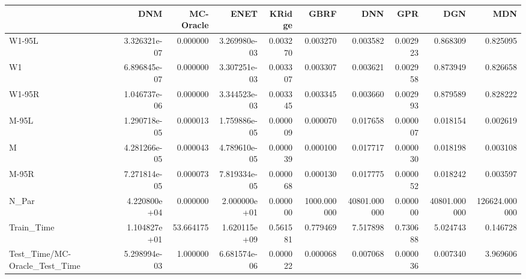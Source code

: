\begin{tabular}{lrrrrrrrrr}
\toprule
{} &           DNM &  MC-Oracle &          ENET &    KRidge &         GBRF &           DNN &       GPR &           DGN &            MDN \\
\midrule
W1-95L                        &  3.326321e-07 &   0.000000 &  3.269980e-03 &  0.003270 &     0.003270 &      0.003582 &  0.002923 &      0.868309 &       0.825095 \\
W1                            &  6.896845e-07 &   0.000000 &  3.307251e-03 &  0.003307 &     0.003307 &      0.003621 &  0.002958 &      0.873949 &       0.826658 \\
W1-95R                        &  1.046737e-06 &   0.000000 &  3.344523e-03 &  0.003345 &     0.003345 &      0.003660 &  0.002993 &      0.879589 &       0.828222 \\
M-95L                         &  1.290718e-05 &   0.000013 &  1.759886e-05 &  0.000009 &     0.000070 &      0.017658 &  0.000007 &      0.018154 &       0.002619 \\
M                             &  4.281266e-05 &   0.000043 &  4.789610e-05 &  0.000039 &     0.000100 &      0.017717 &  0.000030 &      0.018198 &       0.003108 \\
M-95R                         &  7.271814e-05 &   0.000073 &  7.819334e-05 &  0.000068 &     0.000130 &      0.017775 &  0.000052 &      0.018242 &       0.003597 \\
N\_Par                         &  4.220800e+04 &   0.000000 &  2.000000e+01 &  0.000000 &  1000.000000 &  40801.000000 &  0.000000 &  40801.000000 &  126624.000000 \\
Train\_Time                    &  1.104827e+01 &  53.664175 &  1.620115e+09 &  0.561581 &     0.779469 &      7.517898 &  0.730688 &      5.024743 &       0.146728 \\
Test\_Time/MC-Oracle\_Test\_Time &  5.298994e-03 &   1.000000 &  6.681574e-06 &  0.000022 &     0.000068 &      0.007068 &  0.000036 &      0.007340 &       3.969606 \\
\bottomrule
\end{tabular}
